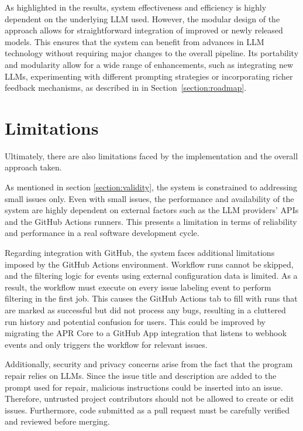 As highlighted in the results, system effectiveness and efficiency is highly dependent on the underlying \ac{LLM} used. However, the modular design of the approach allows for straightforward integration of improved or newly released models. This ensures that the system can benefit from advances in \ac{LLM} technology without requiring major changes to the overall pipeline. Its portability and modularity allow for a wide range of enhancements, such as integrating new \acp{LLM}, experimenting with different prompting strategies or incorporating richer feedback mechanisms, as described in in Section~\ref{section:roadmap}.

\section{Limitations}
Ultimately, there are also limitations faced by the implementation and the overall approach taken.

As mentioned in section \ref{section:validity}, the system is constrained to addressing small issues only. Even with small issues, the performance and availability of the system are highly dependent on external factors such as the \ac{LLM} providers' APIs and the GitHub Actions runners. This presents a limitation in terms of reliability and performance in a real software development cycle.

Regarding integration with GitHub, the system faces additional limitations imposed by the GitHub Actions environment. Workflow runs cannot be skipped, and the filtering logic for events using external configuration data is limited. As a result, the workflow must execute on every issue labeling event to perform filtering in the first job. This causes the GitHub Actions tab to fill with runs that are marked as successful but did not process any bugs, resulting in a cluttered run history and potential confusion for users. This could be improved by migrating the APR Core to a GitHub App integration that listens to webhook events and only triggers the workflow for relevant issues.

Additionally, security and privacy concerns arise from the fact that the program repair relies on \acp{LLM}. Since the issue title and description are added to the prompt used for repair, malicious instructions could be inserted into an issue. Therefore, untrusted project contributors should not be allowed to create or edit issues. Furthermore, code submitted as a pull request must be carefully verified and reviewed before merging.

